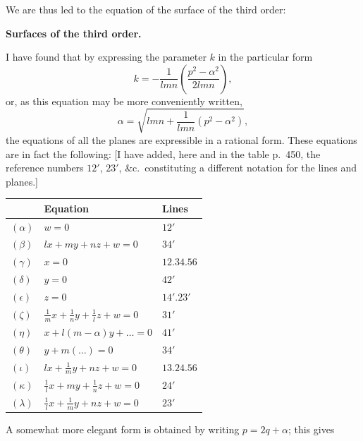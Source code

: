\documentclass[11pt,a4paper]{article}
\theoremstyle{definition}
\begin{document}
We are thus led to the equation of the surface of the third order:

\newpage

\setcounter{page}{447}

\begin{center}
\textbf{Surfaces of the third order.}
\end{center}

I have found that by expressing the parameter $k$ in the particular form
\[
k = -\frac{1}{lmn}\left(\frac{p^{2} - \alpha^{2}}{2lmn}\right),
\]
or, as this equation may be more conveniently written,
\[
\alpha = \sqrt{lmn + \frac{1}{lmn}(p^{2} - \alpha^{2})},
\]
the equations of all the planes are expressible in a rational form. These equations are in fact the following: [I have added, here and in the table p.~450, the reference numbers $12'$, $23'$, \&c.\ constituting a different notation for the lines and planes.]

\begin{table}[h]
\centering
\begin{tabular}{@{}lll@{}}
\toprule
& Equation & Lines \\
\midrule
$(\alpha)$ & $w = 0$ & $12'$ \\
$(\beta)$ & $lx + my + nz + w = 0$ & $34'$ \\
$(\gamma)$ & $x = 0$ & $12.34.56$ \\
$(\delta)$ & $y = 0$ & $42'$ \\
$(\epsilon)$ & $z = 0$ & $14'.23'$ \\
$(\zeta)$ & $\frac{1}{m}x + \frac{1}{n}y + \frac{1}{l}z + w = 0$ & $31'$ \\
$(\eta)$ & $x + l(m - \alpha)y + \ldots = 0$ & $41'$ \\
$(\theta)$ & $y + m(\ldots) = 0$ & $34'$ \\
$(\iota)$ & $lx + \frac{1}{m}y + nz + w = 0$ & $13.24.56$ \\
$(\kappa)$ & $\frac{1}{l}x + my + \frac{1}{n}z + w = 0$ & $24'$ \\
$(\lambda)$ & $\frac{1}{l}x + \frac{1}{m}y + nz + w = 0$ & $23'$ \\
\bottomrule
\end{tabular}
\end{table}

A somewhat more elegant form is obtained by writing $p = 2q + \alpha$; this gives

\newpage

\setcounter{page}{448}
\end{document}
